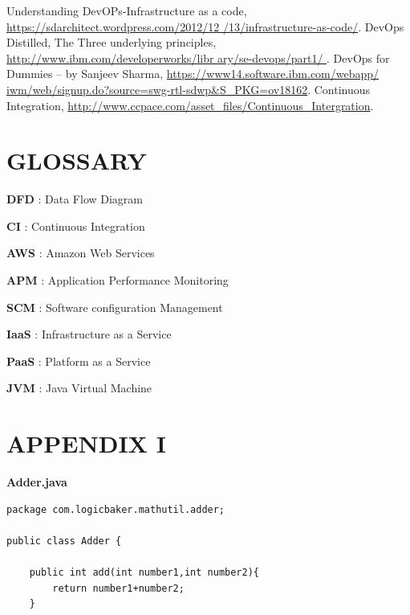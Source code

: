 \documentclass[12pt,a4paper,oneside]{report}
\begin{document}
{\begin{thebibliography}{999}
Understanding DevOPs-Infrastructure as a code,\hspace{2pt}
 \url{https://sdarchitect.wordpress.com/2012/12
/13/infrastructure-as-code/}.
 DevOps Distilled, The Three underlying principles, \url{ http://www.ibm.com/developerworks/libr ary/se-devops/part1/ }. 
DevOps for Dummies – by Sanjeev Sharma, \url{https://www14.software.ibm.com/webapp/ iwm/web/signup.do?source=swg-rtl-sdwp&S_PKG=ov18162}.
Continuous Integration, \url{http://www.ccpace.com/asset_files/Continuous_Intergration}.
\end{thebibliography}
\chapter*{GLOSSARY}
\rhead{\empty}

\textbf{DFD}  : Data Flow Diagram
\par \textbf{CI} : Continuous Integration
 \par \textbf{AWS} : Amazon Web Services
\par \textbf{APM} : Application Performance Monitoring
\par  \textbf{SCM} : Software configuration Management
\par \textbf{IaaS} : Infrastructure as a Service
\par \textbf{PaaS} : Platform as a Service
\par \textbf{JVM} : Java Virtual Machine
\newpage
\chapter*{APPENDIX I}
\renewcommand{\bibname}{\uppercase{APPENDIX I}}
\large{\textbf{}}
\appendix

\textbf{Adder.java}
\begin{lstlisting}
package com.logicbaker.mathutil.adder;

public class Adder {
	
	public int add(int number1,int number2){
		return number1+number2;
	}


\end{lstlisting}}
\end{document}
